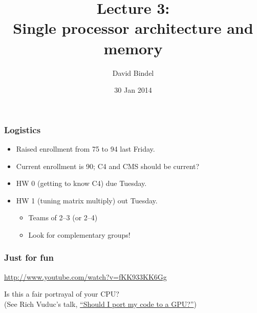 \documentclass{beamer}
\title[CS 5220, Spring 2014]{Lecture 3: \\
  Single processor architecture and memory}
\author[]{David Bindel} \date[]{30 Jan 2014}
\begin{document}
\begin{frame}
  \titlepage
\end{frame}


\begin{frame}
  \frametitle{Logistics}

  \begin{itemize}
  \item Raised enrollment from 75 to 94 last Friday.
  \item Current enrollment is 90; C4 and CMS should be current?
  \item HW 0 (getting to know C4) due Tuesday.
  \item HW 1 (tuning matrix multiply) out Tuesday.
    \begin{itemize}
    \item Teams of 2--3 (or 2--4)
    \item Look for complementary groups!
    \end{itemize}
  \end{itemize}
\end{frame}

\begin{frame}
  \frametitle{Just for fun}
  
  \begin{center}
  \url{http://www.youtube.com/watch?v=fKK933KK6Gg}
  \end{center}

  \begin{center}
    Is this a fair portrayal of your CPU? \\[5mm]
    (See Rich Vuduc's talk, 
    \href{http://web.eecs.utk.edu/~dongarra/ccgsc2010/slides/talk27-vuduc.pdf}
         {``Should I port my code to a GPU?''})
  \end{center}
\end{frame}
\end{document}
